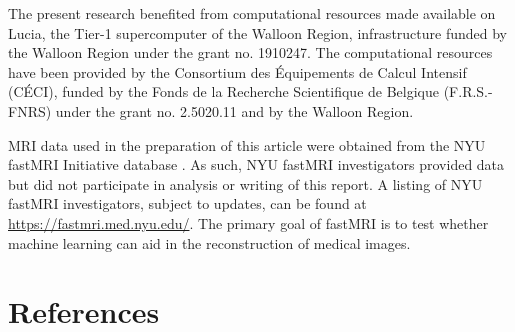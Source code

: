 The present research benefited from computational resources made available on Lucia, the Tier-1 supercomputer of the Walloon Region, infrastructure funded by the Walloon Region under the grant no. 1910247. The computational resources have been provided by the Consortium des Équipements de Calcul Intensif (CÉCI), funded by the Fonds de la Recherche Scientifique de Belgique (F.R.S.-FNRS) under the grant no. 2.5020.11 and by the Walloon Region.

MRI data used in the preparation of this article were obtained from the NYU fastMRI Initiative database \cite{knoll2020fastmri, zbontar2018fastmri}. As such, NYU fastMRI investigators provided data but did not participate in analysis or writing of this report. A listing of NYU fastMRI investigators, subject to updates, can be found at \url{https://fastmri.med.nyu.edu/}. The primary goal of fastMRI is to test whether machine learning can aid in the reconstruction of medical images.

\clearpage
\section*{References}

\printbibliography[heading=none]

